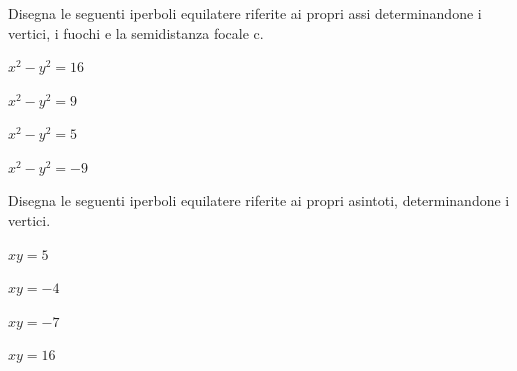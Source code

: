 \newpage
\subsubsection*{}

\begin{esercizio}
\label{ese:div.003}
Disegna le seguenti iperboli equilatere riferite ai propri assi 
determinandone i vertici, i fuochi e la semidistanza focale c.
\begin{multicols}{4}
\begin{enumeratea}
\item \( x^{2} - y^{2} =16\)    
\item \( x^{2} - y^{2} =9\) 
\item \( x^{2} - y^{2} =5\)         
\item\( x^{2} - y^{2} =-9\)
\end{enumeratea}
\end{multicols}
\end{esercizio}

\begin{esercizio}
\label{ese:div.003}
Disegna le seguenti iperboli equilatere riferite ai propri asintoti, 
determinandone i vertici.
\begin{multicols}{4}
\begin{enumeratea}
\item \(xy=5\)
\item \(xy=-4\) 
\item \(xy=-7\)
\item \(xy=16\)
\end{enumeratea}
\end{multicols}
\end{esercizio}

